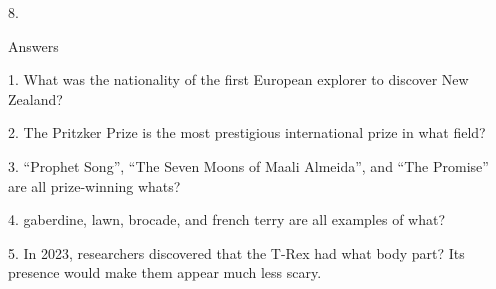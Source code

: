\begin{frame}
\begin{center}
\Large
8. 
\end{center}
\end{frame}
\begin{frame}
\begin{center}
\Huge
Answers
\end{center}
\end{frame}
\begin{frame}
\begin{center}
\Large
1. What was the nationality of the first European explorer to discover New Zealand?
\\
\end{center}
\end{frame}
\begin{frame}
\begin{center}
\Large
2. The Pritzker Prize is the most prestigious international prize in what field?
\\
\end{center}
\end{frame}
\begin{frame}
\begin{center}
\Large
3. ``Prophet Song'', ``The Seven Moons of Maali Almeida'', and ``The Promise'' are all prize-winning whats?
\\
\end{center}
\end{frame}
\begin{frame}
\begin{center}
\Large
4. gaberdine, lawn, brocade, and french terry are all examples of what?
\\
\end{center}
\end{frame}
\begin{frame}
\begin{center}
\Large
5. In 2023, researchers discovered that the T-Rex had what body part? Its presence would make them appear much less scary.
\\
\end{center}
\end{frame}
